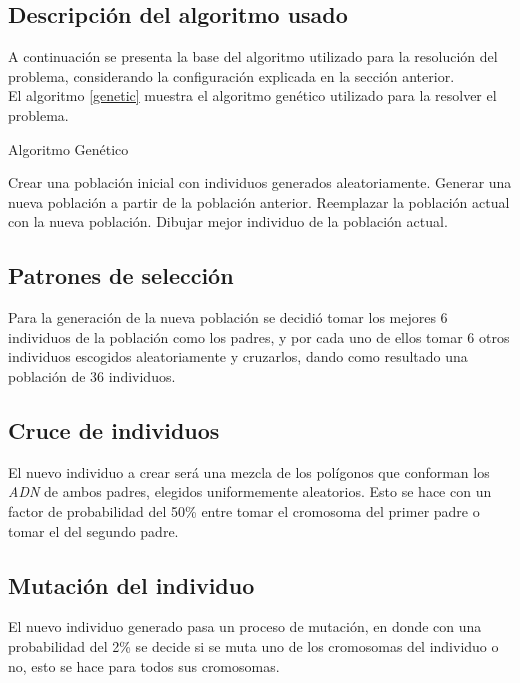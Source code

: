 \documentclass[11pt, spanish]{article}
\begin{document}
\subsection{Descripción del algoritmo usado}
A continuación se presenta la base del algoritmo utilizado para la
resolución del problema, considerando la configuración explicada en la
sección anterior.\\

El algoritmo \ref{genetic} muestra el algoritmo genético utilizado
para la resolver el problema.

\begin{algorithm}
  \caption{Algoritmo Genético}
  \label{genetic}
  \begin{algorithmic}
    \STATE Crear una población inicial con individuos generados
    aleatoriamente.   \STATE Generar una
    nueva población a partir de la población anterior.  \STATE
    Reemplazar la población actual con la nueva población.  
    \STATE Dibujar mejor individuo de la población actual.
    \ENDIF
    \ENDFOR
  \end{algorithmic}
\end{algorithm}

\subsection{Patrones de selección}
Para la generación de la nueva población se decidió tomar los mejores
6 individuos de la población como los padres, y por cada uno de ellos
tomar 6 otros individuos escogidos aleatoriamente y cruzarlos, dando
como resultado una población de 36 individuos.

\subsection{Cruce de individuos}
El nuevo individuo a crear será una mezcla de los polígonos que
conforman los \emph{ADN} de ambos padres, elegidos uniformemente
aleatorios. Esto se hace con un factor de probabilidad del 50\% entre
tomar el cromosoma del primer padre o tomar el del segundo padre.

\subsection{Mutación del individuo}
El nuevo individuo generado pasa un proceso de mutación, en donde con
una probabilidad del 2\% se decide si se muta uno de los cromosomas
del individuo o no, esto se hace para todos sus cromosomas.\\
\end{document}
